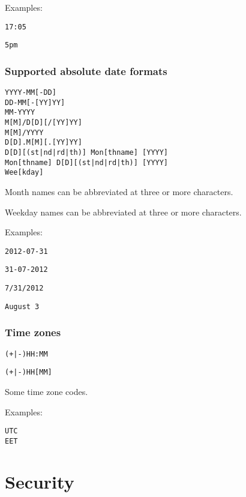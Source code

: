 \documentclass[a4,onecolumn,portrait]{article}
\begin{document}
Examples:

\begin{verbatim}
17:05
\end{verbatim}

\begin{verbatim}
5pm
\end{verbatim}
\subsubsection{Supported absolute date formats}
\label{sec-8-3-4}

\begin{verbatim}
YYYY-MM[-DD]
DD-MM[-[YY]YY]
MM-YYYY
M[M]/D[D][/[YY]YY]
M[M]/YYYY
D[D].M[M][.[YY]YY]
D[D][(st|nd|rd|th)] Mon[thname] [YYYY]
Mon[thname] D[D][(st|nd|rd|th)] [YYYY]
Wee[kday]
\end{verbatim}

Month names can be abbreviated at three or more characters.

Weekday names can be abbreviated at three or more characters.

Examples:

\begin{verbatim}
2012-07-31
\end{verbatim}

\begin{verbatim}
31-07-2012
\end{verbatim}

\begin{verbatim}
7/31/2012
\end{verbatim}

\begin{verbatim}
August 3
\end{verbatim}
\subsubsection{Time zones}
\label{sec-8-3-5}

\begin{verbatim}
(+|-)HH:MM
\end{verbatim}

\begin{verbatim}
(+|-)HH[MM]
\end{verbatim}

Some time zone codes.

Examples:

\begin{verbatim}
UTC
EET
\end{verbatim}
\section{Security}
\label{sec-9}
\end{document}
